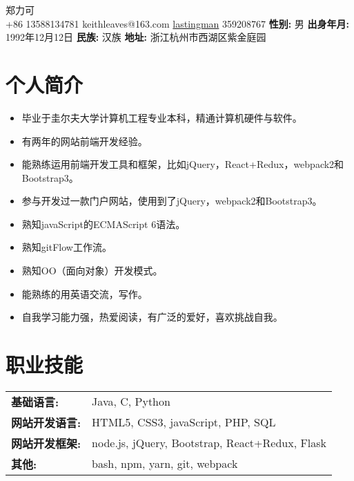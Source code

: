 \documentclass[10pt, letterpaper]{article}
\makeatletter
\newcommand*{\nametitle}[1]{{\fontsize{32pt}{1em}\color{awesome-emerald} #1 \\[0.6\baselineskip]}}
\newcommand*{\subinfo}[2]{\hspace{5pt} {\color{darktext}#1} \hspace*{2pt} {\color{lighttext}#2} \hspace{5pt}}
\newenvironment{skills}{
    \noindent
    \begin{tabular}{@{}l l@{}}
}{
    \end{tabular}
}
\newcommand*{\skill}[2]{
	\textbf{\color{darktext}#1} & {\fontsize{2pt}{1em}#2} \\
}
\makeatother
\begin{document}
\begin{center}
\nametitle{郑力可}
\subinfo{\faPhoneSquare}{+86 13588134781}
\subinfo{\faEnvelope}{keithleaves@163.com}
\subinfo{\faGithub}{\href{https://github.com/lastingman}{lastingman}}
\subinfo{\faWechat}{359208767}
\newline
\subinfo{\textbf{性别:}}{男}
\subinfo{\textbf{出身年月:}}{1992年12月12日}
\subinfo{\textbf{民族:}}{汉族}
\subinfo{\textbf{地址:}}{浙江杭州市西湖区紫金庭园}
\end{center}


\color{lighttext}

\section*{个人简介}
\noindent
\begin{itemize}[leftmargin=*]
    \item 毕业于圭尔夫大学计算机工程专业本科，精通计算机硬件与软件。
    \item 有两年的网站前端开发经验。
    \item 能熟练运用前端开发工具和框架，比如jQuery，React+Redux，webpack2和Bootstrap3。
    \item 参与开发过一款门户网站，使用到了jQuery，webpack2和Bootstrap3。
    \item 熟知javaScript的ECMAScript 6语法。
    \item 熟知gitFlow工作流。
    \item 熟知OO（面向对象）开发模式。
    \item 能熟练的用英语交流，写作。
    \item 自我学习能力强，热爱阅读，有广泛的爱好，喜欢挑战自我。
\end{itemize}

\section*{职业技能}
\begin{skills}
\skill{基础语言:}{Java, C, Python}
\skill{网站开发语言:}{HTML5, CSS3, javaScript, PHP, SQL}
\skill{网站开发框架:}{node.js, jQuery, Bootstrap, React+Redux, Flask}
\skill{其他:}{bash, npm, yarn, git, webpack}
\end{skills}
\end{document}
